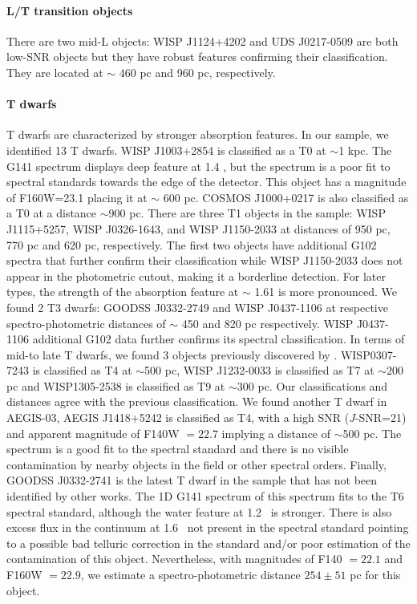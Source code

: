 \documentclass[manuscript]{aastex63}
\begin{document}
\paragraph{L/T transition objects}
There are two mid-L objects: WISP J1124+4202 and UDS J0217-0509 are both low-SNR objects but they have robust \wat features confirming their classification. They are located at $\sim$ 460 pc and 960 pc, respectively.

\paragraph{T dwarfs}
T dwarfs are characterized by stronger \wat absorption \meth features. In our sample, we identified 13 T dwarfs. WISP J1003+2854 is classified as a T0 at $\sim$1 kpc. The G141 spectrum displays deep \wat feature at 1.4 \micron, but the spectrum is a poor fit to spectral standards towards the edge of the detector. This object has a magnitude of F160W=23.1 placing it at $\sim$ 600 pc. COSMOS J1000+0217 is also classified as a T0 at a distance $\sim$900 pc. There are three T1 objects in the sample: WISP J1115+5257, WISP J0326-1643, and WISP J1150-2033 at distances of 950 pc, 770 pc and 620 pc, respectively. The first two objects have additional G102 spectra that further confirm their classification while WISP J1150-2033 does not appear in the photometric cutout, making it a borderline detection. For later types, the strength of the \meth absorption feature at $\sim$ 1.61 \micron is more pronounced. We found 2 T3 dwarfs: GOODSS J0332-2749 and WISP J0437-1106 at respective spectro-photometric distances of $\sim$ 450 and 820 pc respectively.  WISP J0437-1106 additional G102 data further confirms its spectral classification. In terms of mid-to late T dwarfs, we found 3 objects previously discovered by \cite{2012ApJ...752L..14M}. WISP0307-7243 is classified as T4 at $\sim$500 pc, WISP J1232-0033 is classified as T7 at $\sim$200 pc and  WISP1305-2538 is classified as T9 at $\sim$300 pc. Our classifications and distances agree with the previous classification. We found another T dwarf in AEGIS-03, AEGIS J1418+5242 is classified as T4, with a high SNR ($J$-SNR=21) and apparent magnitude of F140W $=22.7$ implying a distance of $\sim$500 pc. The spectrum is a good fit to the spectral standard and there is no visible contamination by nearby objects in the field or other spectral orders. Finally, GOODSS J0332-2741 is the latest T dwarf in the sample that has not been identified by other works. The 1D G141 spectrum of this spectrum fits to the T6 spectral standard, although the water feature at 1.2 \micron\ is stronger. There is also excess flux in the continuum at 1.6 \micron\ not present in the spectral standard pointing to a possible bad telluric correction in the standard and/or poor estimation of the contamination of this object. Nevertheless, with magnitudes of F140 $=22.1$ and F160W $=22.9$, we estimate a spectro-photometric distance $254\pm51$ pc for this object. 
\end{document}

